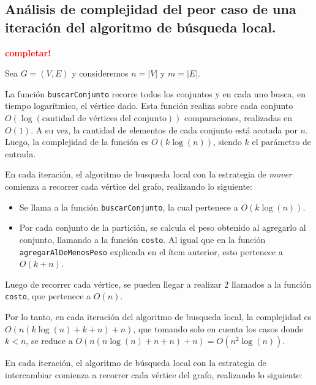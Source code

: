 \newpage
\subsection{Análisis de complejidad del peor caso de una iteración del
            algoritmo de búsqueda local.}
\vspace*{0.3cm}
\textcolor{red}{\textbf{completar!}}

Sea $G = (V,E)$ y consideremos $n = |V|$ y $m = |E|$.

La función \texttt{buscarConjunto} recorre todos los conjuntos y en cada uno
busca, en tiempo logarítmico, el vértice dado. Esta función realiza sobre cada
conjunto $O(\log(\text{cantidad de vértices del conjunto}))$ comparaciones,
realizadas en $O(1)$. A su vez, la cantidad de elementos de cada conjunto está
acotada por $n$. Luego, la complejidad de la función es $O(k\log(n))$, siendo
$k$ el parámetro de entrada.

\vspace*{0.3cm}

En cada iteración, el algoritmo de busqueda local con la estrategia de
\textit{mover} comienza a recorrer cada vértice del grafo, realizando lo siguiente:
\begin{itemize}
  \item Se llama a la función \texttt{buscarConjunto}, la cual pertenece a
  $O(k\log(n))$.

  \item Por cada conjunto de la partición, se calcula el peso obtenido al
  agregarlo al conjunto, llamando a la función \texttt{costo}. Al igual que en
  la función \texttt{agregarAlDeMenosPeso} explicada en el ítem anterior, esto
  pertenece a $O(k + n)$.
\end{itemize}

Luego de recorrer cada vértice, se pueden llegar a realizar 2 llamados a
la función \texttt{costo}, que pertenece a $O(n)$.

Por lo tanto, en cada iteración del algoritmo de busqueda local, la complejidad
es $O(n (k\log(n) + k + n) + n)$, que tomando solo en cuenta los casos donde
$k < n$, se reduce a $O(n (n\log(n) + n + n) + n) = O(n^2 \log(n))$.

\vspace*{0.3cm}

En cada iteración, el algoritmo de búsqueda local con la estrategia de
intercambiar comienza a recorrer cada vértice del grafo, realizando lo siguiente:

